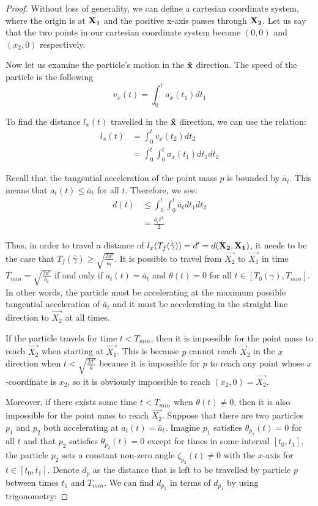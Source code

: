 \begin{proof}

Without loss of generality, we can define a cartesian coordinate system, where the origin is at $\mathbf{X_1}$ and the positive x-axis passes through $\mathbf{X_2}$. Let us say that the two points in our cartesian coordinate system become $(0,0)$ and $(x_2, 0)$ respectively.

Now let us examine the particle's motion in the $\mathbf{\hat{x}}$ direction. The speed of the particle is the following
\begin{equation}
  v_x(t) = \int_0^t a_x(t_1) dt_1
\end{equation}

To find the distance $l_x(t)$ travelled in the $\mathbf{\hat{x}}$ direction, we can use the relation:
\begin{align}
  l_x(t) &= \int_0^t v_x(t_2) dt_2 \\
  &= \int_0^t \int_0^t a_x(t_1) dt_1 dt_2
\end{align}

Recall that the tangential acceleration of the point mass $p$ is bounded by $\bar{a}_{t}$. This means that $a_t(t) \leq \bar{a}_t$ for all $t$. Therefore, we see:
\begin{align}
  d(t) &\leq \int_0^t \int_0^t \bar{a}_t dt_1 dt_2\\
  &= \frac{\bar{a}_t t^2}{2}
\end{align}

Thus, in order to travel a distance of $l_x(T_f(\hat{\gamma})) = d' = d(\mathbf{X_2}, \mathbf{X_1})$, it needs to be the case that $T_f(\hat{\gamma}) \geq \sqrt{\frac{2 d'}{\bar{a}_t}}$. It is possible to travel from $\vec{X_2}$ to $\vec{X_1}$ in time $T_{min} = \sqrt{\frac{2 d'}{\bar{a}_t}}$ if and only if $a_t(t) = \bar{a}_t$ and $\theta(t) = 0$ for all $t \in [T_0(\gamma), T_{min}]$. In other words, the particle must be accelerating at the maximum possible tangential acceleration of $\bar{a}_t$ and it must be accelerating in the straight line direction to $\vec{X_2}$ at all times.

If the particle travels for time $t < T_{min}$, then it is impossible for the point mass to reach $\vec{X_2}$ when starting at $\vec{X_1}$. This is because $p$ cannot reach $\vec{X}_2$ in the $x$ direction when $t < \sqrt{\frac{2 d'}{\bar{a}}}$ because it is impossible for $p$ to reach any point whose $x$-coordinate is $x_2$, so it is obviously impossible to reach $(x_2, 0) = \vec{X_2}$.

Moreover, if there exists some time $t < T_{min}$ when $\theta(t) \neq 0$, then it is also impossible for the point mass to reach $\vec{X_2}$. Suppose that there are two particles $p_1$ and $p_2$ both accelerating at $a_t(t) = \bar{a}_t$. Imagine $p_1$ satisfies $\theta_{p_1}(t) = 0$ for all $t$ and that $p_2$ satisfies $\theta_{p_2}(t) = 0$ except for times in some interval $[t_0, t_1]$, the particle $p_2$ sets a constant non-zero angle $\zeta_{p_2}(t) \neq 0$ with the $x$-axis for $t \in [t_0, t_1]$. Denote $d_{p}$ as the distance that is left to be travelled by particle $p$ between times $t_1$ and $T_{min}$. We can find $d_{p_2}$ in terms of $d_{p_1}$ by using trigonometry:


\end{proof}
